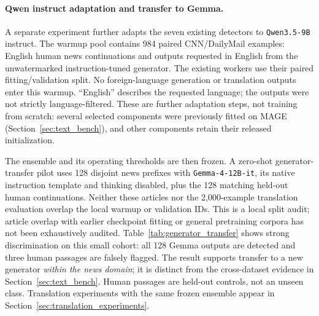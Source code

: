 \paragraph{Qwen instruct adaptation and transfer to Gemma.}
A separate experiment further adapts the seven existing detectors to
\texttt{Qwen3.5-9B} instruct. The warmup pool contains 984 paired CNN/DailyMail
examples: English human news continuations and outputs requested in English
from the unwatermarked instruction-tuned generator. The existing workers use
their paired fitting/validation split. No foreign-language generation or
translation outputs enter this warmup. ``English'' describes the requested
language; the outputs were not strictly language-filtered. These are further
adaptation steps, not training from scratch: several selected components were
previously fitted on MAGE (Section~\ref{sec:text_bench}), and other components
retain their released initialization.

The ensemble and its operating thresholds are then frozen. A zero-shot
generator-transfer pilot uses 128 disjoint news prefixes with
\texttt{Gemma-4-12B-it}, its native instruction template and thinking disabled,
plus the 128 matching held-out human continuations. Neither these articles nor
the 2,000-example translation evaluation overlap the local warmup or validation
IDs. This is a local split audit; article overlap with earlier checkpoint
fitting or general pretraining corpora has not been exhaustively audited.
Table~\ref{tab:generator_transfer} shows strong discrimination on this small
cohort: all 128 Gemma outputs are detected and three human passages are falsely
flagged. The result supports transfer to a new generator \emph{within the news
domain}; it is distinct from the cross-dataset evidence in
Section~\ref{sec:text_bench}. Human passages are held-out controls, not an unseen
class. Translation experiments with the same frozen ensemble appear in
Section~\ref{sec:translation_experiments}.





